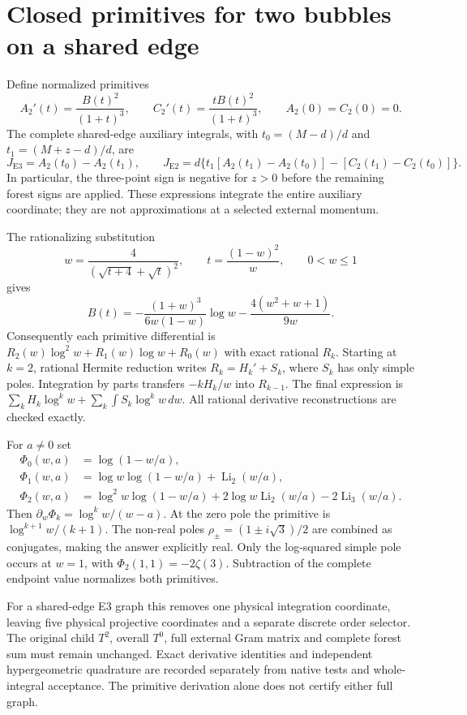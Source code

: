 \documentclass[11pt]{article}
\begin{document}
\section{Closed primitives for two bubbles on a shared edge}
Define normalized primitives
\[
 A_2'(t)=\frac{B(t)^2}{(1+t)^3},\qquad
 C_2'(t)=\frac{tB(t)^2}{(1+t)^3},\qquad A_2(0)=C_2(0)=0.
\]
The complete shared-edge auxiliary integrals, with
$t_0=(M-d)/d$ and $t_1=(M+z-d)/d$, are
\[
 J_{\mathrm{E3}}=A_2(t_0)-A_2(t_1),\qquad
 J_{\mathrm{E2}}=d\{t_1[A_2(t_1)-A_2(t_0)]-[C_2(t_1)-C_2(t_0)]\}.
\]
In particular, the three-point sign is negative for $z>0$ before the
remaining forest signs are applied. These expressions integrate the
entire auxiliary coordinate; they are not approximations at a selected
external momentum.

The rationalizing substitution
\[
 w=\frac{4}{(\sqrt{t+4}+\sqrt t)^2},\qquad
 t=\frac{(1-w)^2}{w},\qquad 0<w\leq1
\]
gives
\[
 B(t)=-\frac{(1+w)^3}{6w(1-w)}\log w
       -\frac{4(w^2+w+1)}{9w}.
\]
Consequently each primitive differential is
$R_2(w)\log^2w+R_1(w)\log w+R_0(w)$ with exact rational $R_k$.
Starting at $k=2$, rational Hermite reduction writes
$R_k=H_k'+S_k$, where $S_k$ has only simple poles. Integration by
parts transfers $-kH_k/w$ into $R_{k-1}$. The final expression is
$\sum_k H_k\log^kw+\sum_k\int S_k\log^kw\,dw$.
All rational derivative reconstructions are checked exactly.

For $a\ne0$ set
\begin{align*}
 \Phi_0(w,a)&=\log(1-w/a),\\
 \Phi_1(w,a)&=\log w\log(1-w/a)+\operatorname{Li}_2(w/a),\\
 \Phi_2(w,a)&=\log^2w\log(1-w/a)
       +2\log w\operatorname{Li}_2(w/a)-2\operatorname{Li}_3(w/a).
\end{align*}
Then $\partial_w\Phi_k=\log^kw/(w-a)$. At the zero pole the primitive
is $\log^{k+1}w/(k+1)$. The non-real poles
$\rho_\pm=(1\pm i\sqrt3)/2$ are combined as conjugates, making the
answer explicitly real. Only the log-squared simple pole occurs at
$w=1$, with $\Phi_2(1,1)=-2\zeta(3)$. Subtraction of the complete
endpoint value normalizes both primitives.

For a shared-edge E3 graph this removes one physical integration
coordinate, leaving five physical projective coordinates and a separate
discrete order selector. The original child $T^2$, overall $T^0$, full
external Gram matrix and complete forest sum must remain unchanged.
Exact derivative identities and independent hypergeometric quadrature
are recorded separately from native tests and whole-integral acceptance.
The primitive derivation alone does not certify either full graph.
\end{document}
